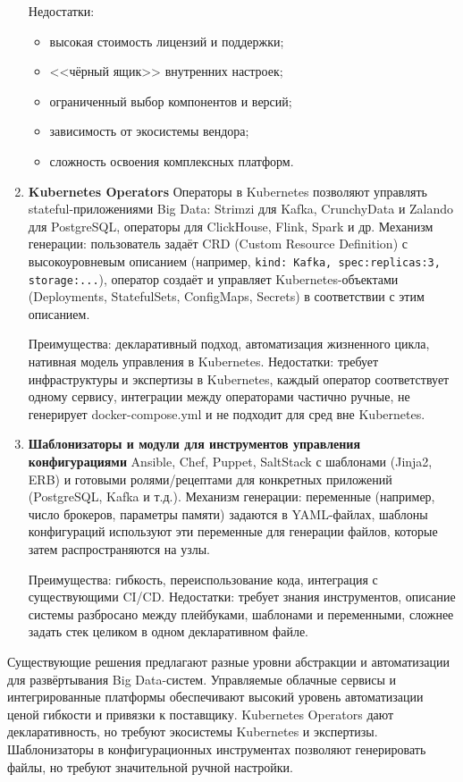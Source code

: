\begin{enumerate}
	      Недостатки:
	      \begin{itemize}
		      \item высокая стоимость лицензий и поддержки;
		      \item <<чёрный ящик>> внутренних настроек;
		      \item ограниченный выбор компонентов и версий;
		      \item зависимость от экосистемы вендора;
		      \item сложность освоения комплексных платформ.
	      \end{itemize}
	\item \textbf{Kubernetes Operators}
	      Операторы в Kubernetes\cite{k8s} позволяют управлять stateful-приложениями Big Data: Strimzi для Kafka, CrunchyData и Zalando для PostgreSQL, операторы для ClickHouse, Flink, Spark и др.
	      Механизм генерации: пользователь задаёт CRD (Custom Resource Definition) с высокоуровневым описанием (например, \texttt{kind: Kafka, spec:{replicas:3, storage:...}}), оператор создаёт и управляет Kubernetes-объектами (Deployments, StatefulSets, ConfigMaps, Secrets) в соответствии с этим описанием.

	      Преимущества: декларативный подход, автоматизация жизненного цикла, нативная модель управления в Kubernetes.
	      Недостатки: требует инфраструктуры и экспертизы в Kubernetes, каждый оператор соответствует одному сервису, интеграции между операторами частично ручные, не генерирует docker-compose.yml и не подходит для сред вне Kubernetes.
	\item \textbf{Шаблонизаторы и модули для инструментов управления конфигурациями}
	      Ansible, Chef, Puppet, SaltStack с шаблонами (Jinja2, ERB) и готовыми ролями/рецептами для конкретных приложений (PostgreSQL, Kafka и т.д.).
	      Механизм генерации: переменные (например, число брокеров, параметры памяти) задаются в YAML-файлах, шаблоны конфигураций используют эти переменные для генерации файлов, которые затем распространяются на узлы.

	      Преимущества: гибкость, переиспользование кода, интеграция с существующими CI/CD.
	      Недостатки: требует знания инструментов, описание системы разбросано между плейбуками, шаблонами и переменными, сложнее задать стек целиком в одном декларативном файле.
\end{enumerate}

Существующие решения предлагают разные уровни абстракции и автоматизации для развёртывания Big Data-систем.
Управляемые облачные сервисы и интегрированные платформы обеспечивают высокий уровень автоматизации ценой гибкости и привязки к поставщику. Kubernetes Operators дают декларативность, но требуют экосистемы Kubernetes и экспертизы.
Шаблонизаторы в конфигурационных инструментах позволяют генерировать файлы, но требуют значительной ручной настройки.

